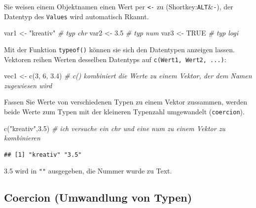 \documentclass[
]{book}
\newenvironment{Shaded}{\begin{snugshade}}{\end{snugshade}}
\newcommand{\CommentTok}[1]{\textcolor[rgb]{0.56,0.35,0.01}{\textit{#1}}}
\newcommand{\ConstantTok}[1]{\textcolor[rgb]{0.00,0.00,0.00}{#1}}
\newcommand{\DecValTok}[1]{\textcolor[rgb]{0.00,0.00,0.81}{#1}}
\newcommand{\FloatTok}[1]{\textcolor[rgb]{0.00,0.00,0.81}{#1}}
\newcommand{\FunctionTok}[1]{\textcolor[rgb]{0.00,0.00,0.00}{#1}}
\newcommand{\NormalTok}[1]{#1}
\newcommand{\OtherTok}[1]{\textcolor[rgb]{0.56,0.35,0.01}{#1}}
\newcommand{\StringTok}[1]{\textcolor[rgb]{0.31,0.60,0.02}{#1}}
\theoremstyle{definition}
\theoremstyle{definition}
\theoremstyle{definition}
\theoremstyle{definition}
\theoremstyle{remark}
\begin{document}
Sie weisen einem Objektnamen einen Wert per \texttt{\textless{}-} zu (Shortkey:\texttt{ALT}\&\texttt{-}), der Datentyp des \texttt{Values} wird automatisch Rkannt.

\begin{Shaded}
\begin{Highlighting}[]
\NormalTok{var1 }\OtherTok{\textless{}{-}} \StringTok{"kreativ"}   \CommentTok{\# typ chr}
\NormalTok{var2 }\OtherTok{\textless{}{-}} \FloatTok{3.5}         \CommentTok{\# typ num}
\NormalTok{var3 }\OtherTok{\textless{}{-}} \ConstantTok{TRUE}        \CommentTok{\# typ logi}
\end{Highlighting}
\end{Shaded}

Mit der Funktion \texttt{typeof()} können sie sich den Datentypen anzeigen lassen.
Vektoren reihen Werten desselben Datentyps auf \texttt{c(Wert1,\ Wert2,\ ...)}:

\begin{Shaded}
\begin{Highlighting}[]
\NormalTok{vec1 }\OtherTok{\textless{}{-}} \FunctionTok{c}\NormalTok{(}\DecValTok{3}\NormalTok{, }\DecValTok{6}\NormalTok{, }\FloatTok{3.4}\NormalTok{)    }\CommentTok{\# c() kombiniert die Werte zu einem Vektor, der dem Namen zugewiesen wird}
\end{Highlighting}
\end{Shaded}

Fassen Sie Werte von verschiedenen Typen zu einem Vektor zussammen, werden beide Werte zum Typen mit der kleineren Typenzahl umgewandelt (\texttt{coercion}).

\begin{Shaded}
\begin{Highlighting}[]
\FunctionTok{c}\NormalTok{(}\StringTok{"kreativ"}\NormalTok{,}\FloatTok{3.5}\NormalTok{)   }\CommentTok{\# ich versuche ein \textasciigrave{}chr\textasciigrave{} und eine \textasciigrave{}num\textasciigrave{} zu einem Vektor zu kombinieren}
\end{Highlighting}
\end{Shaded}

\begin{verbatim}
## [1] "kreativ" "3.5"
\end{verbatim}

3.5 wird in \texttt{""} ausgegeben, die Nummer wurde zu Text.

\hypertarget{coercion-umwandlung-von-typen}{%
\subsection{Coercion (Umwandlung von Typen)}\label{coercion-umwandlung-von-typen}}
\end{document}
